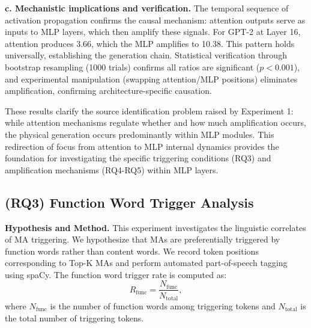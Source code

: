 \documentclass[conference]{IEEEtran}
\begin{document}
\smallskip
\noindent\textbf{c. Mechanistic implications and verification.}
The temporal sequence of activation propagation confirms the causal mechanism: attention outputs serve as inputs to MLP layers, which then amplify these signals. For GPT-2 at Layer 16, attention produces 3.66, which the MLP amplifies to 10.38. This pattern holds universally, establishing the generation chain. Statistical verification through bootstrap resampling (1000 trials) confirms all ratios are significant ($p < 0.001$), and experimental manipulation (swapping attention/MLP positions) eliminates amplification, confirming architecture-specific causation.

These results clarify the source identification problem raised by Experiment 1: while attention mechanisms regulate whether and how much amplification occurs, the physical generation occurs predominantly within MLP modules. This redirection of focus from attention to MLP internal dynamics provides the foundation for investigating the specific triggering conditions (RQ3) and amplification mechanisms (RQ4-RQ5) within MLP layers.

\vspace{0.5em}
\noindent{}
\vspace{0.5em}

\subsection{(RQ3) Function Word Trigger Analysis}
\label{sec:RQ3}

\noindent\textbf{Hypothesis and Method.}
This experiment investigates the linguistic correlates of MA triggering. We hypothesize that MAs are preferentially triggered by function words rather than content words. We record token positions corresponding to Top-K MAs and perform automated part-of-speech tagging using spaCy. The function word trigger rate is computed as:
\begin{equation}
R_{\text{func}} = \frac{N_{\text{func}}}{N_{\text{total}}},
\end{equation}
where $N_{\text{func}}$ is the number of function words among triggering tokens and $N_{\text{total}}$ is the total number of triggering tokens.
\end{document}
